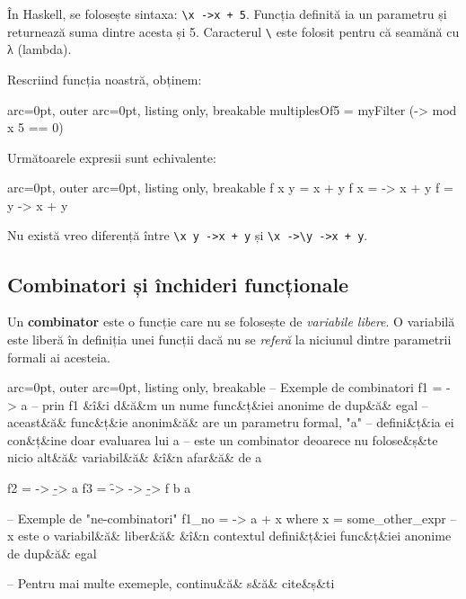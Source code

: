 În Haskell, se folosește sintaxa: \texttt{\textbackslash x -\textgreater  x + 5}. Funcția definită ia un parametru și returnează suma dintre acesta și 5. Caracterul \texttt{\textbackslash } este folosit pentru că seamănă cu λ (lambda).

Rescriind funcția noastră, obținem:

\begin{tcblisting}{ arc=0pt, outer arc=0pt, listing only, breakable}
multiplesOf5 = myFilter (\x -> mod x 5 == 0)

\end{tcblisting}


Următoarele expresii sunt echivalente:


\begin{tcblisting}{ arc=0pt, outer arc=0pt, listing only, breakable}
f x y = x + y
f x = \y -> x + y
f = \x y -> x + y

\end{tcblisting}


\begin{tcolorbox}[colback=blue!10, colframe=blue!20]
Nu există vreo diferență între \texttt{\textbackslash x y -\textgreater  x + y} și \texttt{\textbackslash x -\textgreater  \textbackslash y -\textgreater  x + y}.
\end{tcolorbox}

\subsection*{ Combinatori și închideri funcționale }

Un \textbf{combinator} este o funcție care nu se folosește de \textit{variabile libere}.  O variabilă este liberă în definiția unei funcții dacă nu se \textit{referă} la niciunul dintre parametrii formali ai acesteia.


\begin{tcblisting}{ arc=0pt, outer arc=0pt, listing only, breakable}
-- Exemple de combinatori
f1 = \a -> a 
         -- prin f1 &î&i d&ă&m un nume func&ț&iei anonime de dup&ă& egal
         -- aceast&ă& func&ț&ie anonim&ă& are un parametru formal, "a"
         -- defini&ț&ia ei con&ț&ine doar evaluarea lui a
         -- este un combinator deoarece nu folose&ș&te nicio alt&ă& variabil&ă& &î&n afar&ă& de a

f2 = \a -> \b -> a
f3 = \f -> \a -> \b -> f b a

-- Exemple de "ne-combinatori"
f1_no = \a -> a + x
  where x = some_other_expr
  -- x este o variabil&ă& liber&ă& &î&n contextul defini&ț&iei func&ț&iei anonime de dup&ă& egal

-- Pentru mai multe exemeple, continu&ă& s&ă& cite&ș&ti

\end{tcblisting}


